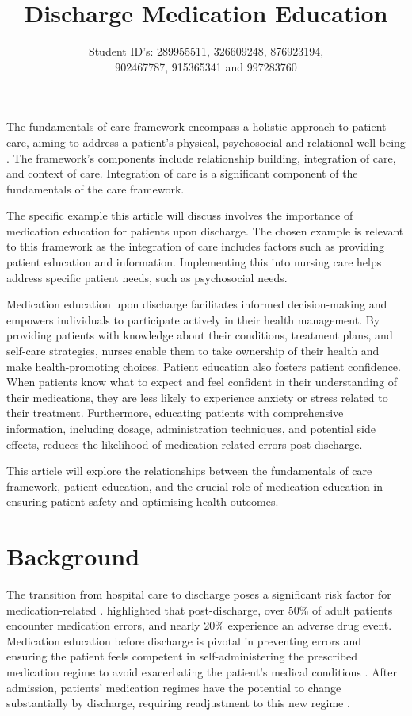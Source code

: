 \documentclass[british,12pt,a4paper]{article}
\title{{\fontsize{14}{15} \textbf{Discharge Medication Education}}}
\author{{\fontsize{14}{15} Student ID's: 289955511, 326609248, 876923194,} \\ {\fontsize{14}{15}902467787, 915365341 and 997283760}}
\date{}
\begin{document}
\maketitle
\thispagestyle{fancy}
The fundamentals of care framework encompass a holistic approach to patient care, aiming to address a patient's physical, psychosocial and relational well-being \parencite{Dempsey2013}.  The framework's components include relationship building, integration of care, and context of care. Integration of care is a significant component of the fundamentals of the care framework.

The specific example this article will discuss involves the importance of medication education for patients upon discharge. The chosen example is relevant to this framework as the integration of care includes factors such as providing patient education and information. Implementing this into nursing care helps address specific patient needs, such as psychosocial needs.

Medication education upon discharge facilitates informed decision-making and empowers individuals to participate actively in their health management. By providing patients with knowledge about their conditions, treatment plans, and self-care strategies, nurses enable them to take ownership of their health and make health-promoting choices. Patient education also fosters patient confidence. When patients know what to expect and feel confident in their understanding of their medications, they are less likely to experience anxiety or stress related to their treatment. Furthermore, educating patients with comprehensive information, including dosage, administration techniques, and potential side effects, reduces the likelihood of medication-related errors post-discharge.

This article will explore the relationships between the fundamentals of care framework, patient education, and the crucial role of medication education in ensuring patient safety and optimising health outcomes.


\section{Background}
The transition from hospital care to discharge poses a significant risk factor for medication-related \parencite{Flatman2021}. \textcite{Alqenae2020} highlighted that post-discharge, over 50\% of adult patients encounter medication errors, and nearly 20\% experience an adverse drug event. Medication education before discharge is pivotal in preventing errors and ensuring the patient feels competent in self-administering the prescribed medication regime to avoid exacerbating the patient's medical conditions \parencite{Hajialibeigloo2021}. After admission, patients' medication regimes have the potential to change substantially by discharge, requiring readjustment to this new regime \parencite{Weir2020}.
\end{document}
